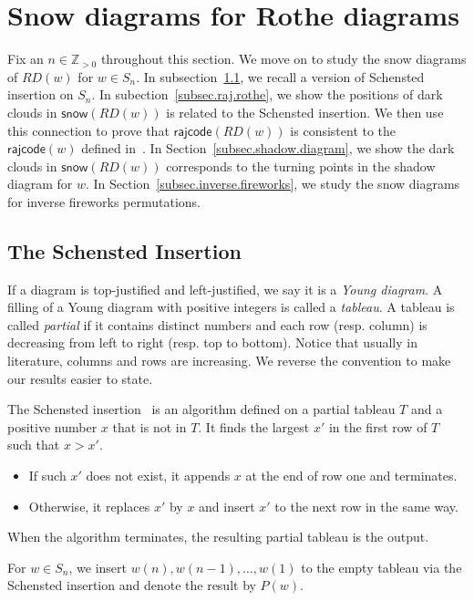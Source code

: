 \documentclass[10pt]{amsart}
\theoremstyle{plain}
\theoremstyle{plain}
\theoremstyle{definition}
\theoremstyle{definition}
\theoremstyle{definition}
\theoremstyle{plain}
\theoremstyle{plain}
\theoremstyle{plain}
\theoremstyle{plain}
\theoremstyle{plain}
\theoremstyle{remark}
\theoremstyle{remark}
\theoremstyle{plain}
\theoremstyle{plain}
\newcommand{\snow}{\mathsf{snow}}
\newcommand{\rajcode}{\mathsf{rajcode}}
\newcommand{\definition}[1]{{\color{darkred}\emph{#1}}}
\begin{document}
\section{Snow diagrams for Rothe diagrams}
\label{S: permutations}
Fix an $n \in \mathbb{Z}_{>0}$
throughout this section. 
We move on to study the snow diagrams 
of $RD(w)$ for $w \in S_n$. 
In subsection~\ref{SS: insertion},
we recall a version of Schensted insertion on $S_n$.
In subection~\ref{subsec.raj.rothe}, we 
show the positions of dark clouds in $\snow(RD(w))$ 
is related to the Schensted insertion.
We then use this connection to 
prove that $\rajcode(RD(w))$ is consistent 
to the $\rajcode(w)$ defined in~\cite{PSW}.
In Section~\ref{subsec.shadow.diagram}, we show the dark clouds
in $\snow(RD(w))$ corresponds to
the turning points in the shadow diagram for $w$.
In Section~\ref{subsec.inverse.fireworks}, we study the
snow diagrams for inverse fireworks permutations.

\subsection{The Schensted Insertion}
\label{SS: insertion}

If a diagram is top-justified and left-justified,
we say it is a \definition{Young diagram}.
A filling of a Young diagram with positive integers
is called a \definition{tableau}.
A tableau is called \definition{partial}
if it contains distinct numbers and 
each row (resp. column) is decreasing from left to right 
(resp. top to bottom).
Notice that usually in literature, columns and rows 
are increasing. 
We reverse the convention to make our results easier to state.

The Schensted insertion~\cite{Sch}
is an algorithm defined on a partial tableau $T$ and 
a positive number $x$ that is not in $T$.
It finds the largest $x'$
in the first row of $T$ 
such that $x > x'$.
\begin{itemize}
    \item If such $x'$ does not exist,
it appends $x$ at the end of row one
and terminates.
    \item Otherwise, it replaces $x'$ by $x$
and insert $x'$ to the next row
in the same way. 
\end{itemize}
When the algorithm terminates, 
the resulting partial tableau is the output. 

For $w \in S_n$, we insert $w(n), w(n-1), \dots, w(1)$ to the empty tableau via the Schensted insertion and denote the result by $P(w)$. 
\end{document}
